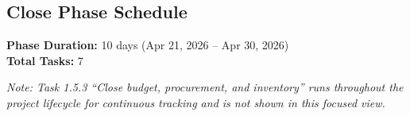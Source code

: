 
\subsection{Close Phase Schedule}

\noindent\textbf{Phase Duration:} 10 days (Apr 21, 2026 -- Apr 30, 2026)
\\\textbf{Total Tasks:} 7

\vspace{0.5em}

\noindent\textit{Note: Task 1.5.3 ``Close budget, procurement, and inventory'' runs throughout the project lifecycle for continuous tracking and is not shown in this focused view.}

\vspace{0.5em}

